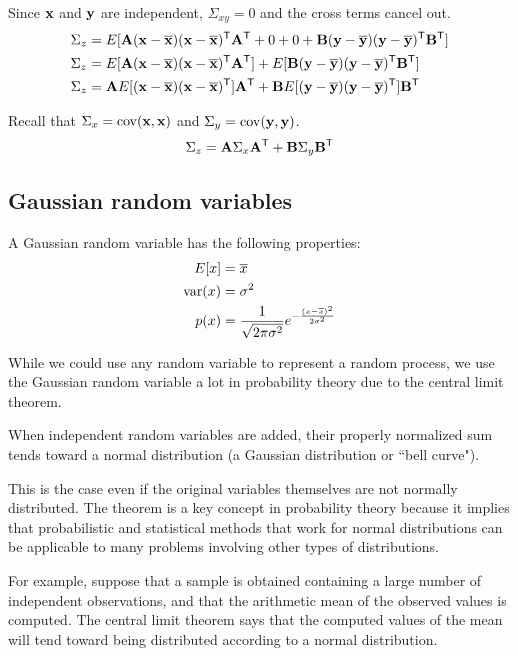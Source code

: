 Since $\mathbf{x}$ and $\mathbf{y}$ are independent, $\Sigma_{xy} = 0$ and the cross
terms cancel out.
\begin{align*}
  \Sigma_z &= E[
    \mathbf{A}(\mathbf{x} - \overline{\mathbf{x}})(\mathbf{x} - \overline{\mathbf{x}})^\mathsf{T}\mathbf{A}^\mathsf{T} + 0 + 0 +
    \mathbf{B}(\mathbf{y} - \overline{\mathbf{y}})(\mathbf{y} - \overline{\mathbf{y}})^\mathsf{T}\mathbf{B}^\mathsf{T}] \\
  \Sigma_z &=
    E[\mathbf{A}(\mathbf{x} - \overline{\mathbf{x}})(\mathbf{x} - \overline{\mathbf{x}})^\mathsf{T}\mathbf{A}^\mathsf{T}] +
    E[\mathbf{B}(\mathbf{y} - \overline{\mathbf{y}})(\mathbf{y} - \overline{\mathbf{y}})^\mathsf{T}\mathbf{B}^\mathsf{T}] \\
  \Sigma_z &=
    \mathbf{A}E[(\mathbf{x} - \overline{\mathbf{x}})(\mathbf{x} - \overline{\mathbf{x}})^\mathsf{T}]\mathbf{A}^\mathsf{T} +
    \mathbf{B}E[(\mathbf{y} - \overline{\mathbf{y}})(\mathbf{y} - \overline{\mathbf{y}})^\mathsf{T}]\mathbf{B}^\mathsf{T}
\end{align*}

Recall that $\Sigma_x = \operatorname{cov}(\mathbf{x}, \mathbf{x})$ and
$\Sigma_y = \operatorname{cov}(\mathbf{y}, \mathbf{y})$.
\begin{equation*}
  \Sigma_z = \mathbf{A}\Sigma_x\mathbf{A}^\mathsf{T} + \mathbf{B}\Sigma_y\mathbf{B}^\mathsf{T}
\end{equation*}

\subsection{Gaussian random variables}

A Gaussian random variable has the following properties:
\begin{align*}
  E[x] &= \overline{x} \\
  \operatorname{var}(x) &= \sigma^2 \\
  p(x) &= \frac{1}{\sqrt{2\pi\sigma^2}}
    e^{-\frac{(x - \overline{x})^2}{2\sigma^2}}
\end{align*}

While we could use any random variable to represent a random process, we use the
Gaussian random variable a lot in probability theory due to the central limit
theorem.
\begin{definition}
  When independent random variables are added, their properly normalized sum
  tends toward a normal distribution (a Gaussian distribution or ``bell curve").
\end{definition}

This is the case even if the original variables themselves are not normally
distributed. The theorem is a key concept in probability theory because it
implies that probabilistic and statistical methods that work for normal
distributions can be applicable to many problems involving other types of
distributions.

For example, suppose that a sample is obtained containing a large number of
independent observations, and that the arithmetic mean of the observed values
is computed. The central limit theorem says that the computed values of the
mean will tend toward being distributed according to a normal distribution.
